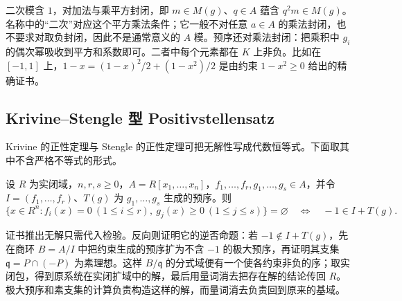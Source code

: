 \ProseParagraphBreak
二次模含 \(1\)，对加法与乘平方封闭，即 \(m\in M(g)\)、\(q\in A\) 蕴含 \(q^2m\in M(g)\)。名称中的“二次”对应这个平方乘法条件；它一般不对任意 \(a\in A\) 的乘法封闭，也不要求对取负封闭，因此不是通常意义的 \(A\) 模。预序还对乘法封闭：把乘积中 \(g_i\) 的偶次幂吸收到平方和系数即可。二者中每个元素都在 \(K\) 上非负。比如在 \([-1,1]\) 上，\(1-x=(1-x)^2/2+(1-x^2)/2\) 是由约束 \(1-x^2\ge0\) 给出的精确证书。

\subsection{Krivine–Stengle 型 Positivstellensatz}
\label{b3:subsec:G04:02}

Krivine 的正性定理与 Stengle 的正性定理可把无解性写成代数恒等式。下面取其中不含严格不等式的形式。

\begin{theorem}\label{b3:thm:real-infeasibility-certificate}
	设 \(R\) 为实闭域，\(n,r,s\ge0\)，\(A=R[x_1,\ldots,x_n]\)，\(f_1,\ldots,f_r,g_1,\ldots,g_s\in A\)，并令 \(I=(f_1,\ldots,f_r)\)、\(T(g)\) 为 \(g_1,\ldots,g_s\) 生成的预序。则
	\[
		\{x\in R^n:f_i(x)=0\ (1\le i\le r),\ g_j(x)\ge0\ (1\le j\le s)\}=\varnothing \quad\Longleftrightarrow\quad -1\in I+T(g).
	\]
\end{theorem}

证书推出无解只需代入检验。反向则证明它的逆否命题：若 \(-1\notin I+T(g)\)，先在商环 \(B=A/I\) 中把约束生成的预序扩为不含 \(-1\) 的极大预序，再证明其支集 \(\mathfrak q=P\cap(-P)\) 为素理想。这样 \(B/\mathfrak q\) 的分式域便有一个使各约束非负的序；取实闭包，得到原系统在实闭扩域中的解，最后用量词消去把存在解的结论传回 \(R\)。极大预序和素支集的计算负责构造这样的解，而量词消去负责回到原来的基域。

